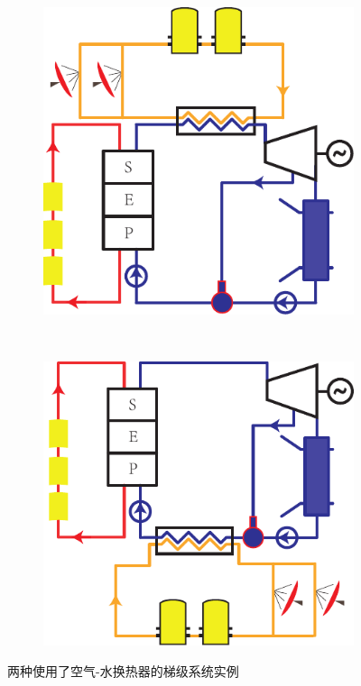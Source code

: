 \noindent \begin{figure}[htbp]
\centering
	\begin{subfigure}[b]{0.4\columnwidth}
	\includegraphics[width = \columnwidth]{fig/air-water1}
	\caption{}\label{fig:air-water_1_c}
	\end{subfigure}
	~
\begin{subfigure}[b]{0.4\columnwidth}
	\includegraphics[width = \columnwidth]{fig/air-water2}
	\caption{}\label{fig:air-water_2_c}
	\end{subfigure}
	\caption{两种使用了空气-水换热器的梯级系统实例}
	\label{fig:air-water_c}
\end{figure}

